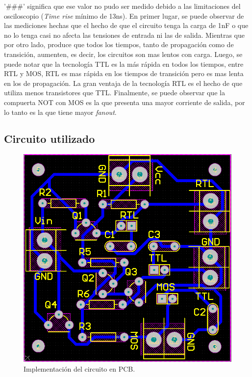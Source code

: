 '\#\#\#' significa que ese valor no pudo ser medido debido a las limitaciones del osciloscopio (\textit{Time rise} m\'inimo de 13ns).
\noindent\newline
\vspace{5}
\newline
En primer lugar, se puede observar de las mediciones hechas que el hecho de que el circuito tenga la carga de 1nF o que no lo tenga casi no afecta las tensiones de entrada ni las de salida. Mientras que por otro lado, produce que todos los tiempos, tanto de propagaci\'on como de transici\'on, aumenten, es decir, los circuitos son mas lentos con carga. \newline
Luego, se puede notar que la tecnolog\'ia TTL es la m\'as r\'apida en todos los tiempos, entre RTL y MOS, RTL es mas r\'apida en los tiempos de transici\'on pero es mas lenta en los de propagaci\'on. La gran ventaja de la tecnolog\'ia RTL es el hecho de que utiliza menos transistores que TTL. Finalmente, se puede observar que la compuerta NOT con MOS es la que presenta una mayor corriente de salida, por lo tanto es la que tiene mayor \textit{fanout}.

\subsection{Circuito utilizado}
\label{ej1_pcb}
\begin{figure}[H]
\center
    \includegraphics[scale = 0.55]{figs/ej1/ej1_PCB.png}
    \caption{Implementaci\'on del circuito en PCB.}
\label{fig:ej1_pcb}
\end{figure}
\noindent\newline